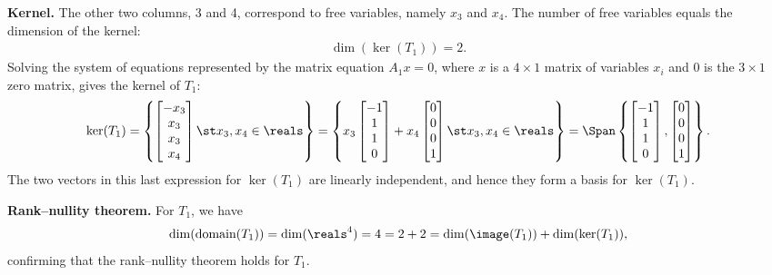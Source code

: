 {\textbf{Kernel.} The other two columns, 3 and 4, correspond to free variables, namely $x_{3}$ and $x_{4}$. The number of free variables equals the dimension of the kernel:
\begin{align*}
\dim(\ker(T_{1}))
=
2.
\end{align*}
Solving the system of equations represented by the matrix equation $A_{1} x = 0$, where $x$ is a $4 \times 1$ matrix of variables $x_{i}$ and $0$ is the $3 \times 1$ zero matrix, gives the kernel of $T_{1}$:
\begin{align*}
\ker(T_{1})
=
\left\{
\begin{bmatrix}
-x_{3}	\\
x_{3}		\\
x_{3}		\\
x_{4}
\end{bmatrix}
\st
x_{3},x_{4} \in \reals
\right\}
=
\left\{
x_{3}
\begin{bmatrix}
-1	\\
1	\\
1	\\
0
\end{bmatrix}%
+
x_{4}
\begin{bmatrix}
0	\\
0	\\
0	\\
1
\end{bmatrix}%
\st
x_{3},x_{4} \in \reals\right\}
=
\Span\left\{
\begin{bmatrix}%
-1	\\
1	\\
1	\\
0
\end{bmatrix}%
,
\begin{bmatrix}
0	\\
0	\\
0	\\
1
\end{bmatrix}%
\right\}.
\end{align*}
The two vectors in this last expression for $\ker(T_{1})$ are linearly independent, and hence they form a basis for $\ker(T_{1})$.

\textbf{Rank--nullity theorem.} For $T_{1}$, we have
\begin{align*}
\dim(\text{domain}(T_{1}))
=
\dim(\reals^{4})
=
4
=
2 + 2
=
\dim(\image(T_{1})) + \dim(\ker(T_{1})),
\end{align*}
confirming that the rank--nullity theorem holds for $T_{1}$.}%



